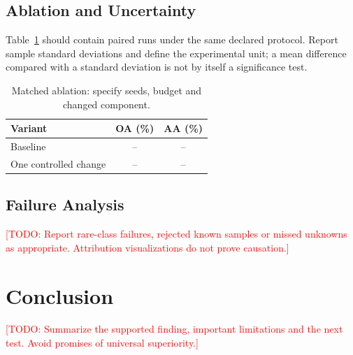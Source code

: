 \documentclass[journal]{IEEEtran}
\newcommand{\placeholder}[1]{\textcolor{red}{[TODO: #1]}}
\begin{document}
\subsection{Ablation and Uncertainty}
Table~\ref{tab:ablation} should contain paired runs under the same declared
protocol. Report sample standard deviations and define the experimental unit;
a mean difference compared with a standard deviation is not by itself a
significance test.
\begin{table}[!t]
\centering
\caption{Matched ablation: specify seeds, budget and changed component.}
\label{tab:ablation}
\begin{tabular}{lcc}
\toprule
Variant & OA (\%) & AA (\%) \\
\midrule
Baseline & -- & -- \\
One controlled change & -- & -- \\
\bottomrule
\end{tabular}
\end{table}

\subsection{Failure Analysis}
\placeholder{Report rare-class failures, rejected known samples or missed
unknowns as appropriate. Attribution visualizations do not prove causation.}

\section{Conclusion}
\placeholder{Summarize the supported finding, important limitations and the
next test. Avoid promises of universal superiority.}



\end{document}
